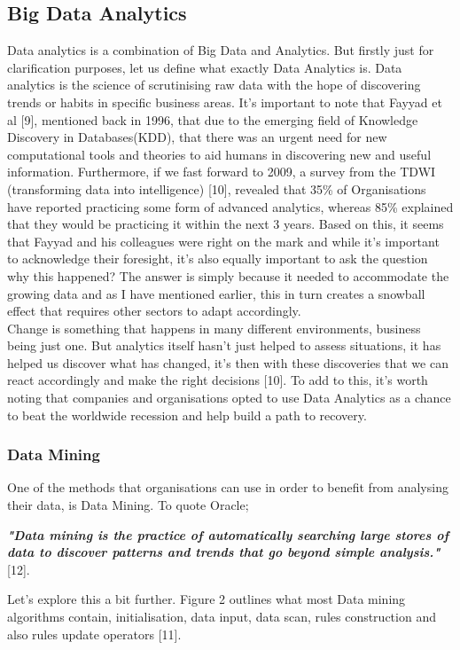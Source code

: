 \documentclass[10pt,journal,compsoc]{IEEEtran}
\begin{document}
\subsection{Big Data Analytics}
 Data analytics is a combination of Big Data and Analytics. But firstly just for clarification purposes, let us define what exactly Data Analytics is. Data analytics is the science of scrutinising raw data with the hope of discovering trends or habits in specific business areas. It's important to note that Fayyad et al [9], mentioned back in 1996, that due to the emerging field of Knowledge Discovery in Databases(KDD), that there was an urgent need for new computational tools and theories to aid humans in discovering new and useful information. Furthermore, if we fast forward to 2009, a survey from the TDWI (transforming data into intelligence) [10], revealed that 35\% of Organisations have reported practicing some form of advanced analytics, whereas 85\% explained that they would be practicing it within the next 3 years. Based on this, it seems that Fayyad and his colleagues were right on the mark and while it's important to acknowledge their foresight, it's also equally important to ask the question why this happened? The answer is simply because it needed to accommodate the growing data and as I have mentioned earlier, this in turn creates a snowball effect that requires other sectors to adapt accordingly.\\
Change is something that happens in many different environments, business being just one. But analytics itself hasn't just helped to assess situations, it has helped us discover what has changed, it's then with these discoveries that we can react accordingly and make the right decisions [10]. To add to this, it's worth noting that companies and organisations opted to use Data Analytics as a chance to beat the worldwide recession and help build a path to recovery.

\subsubsection{Data Mining} 
One of the methods that organisations can use in order to benefit from analysing their data, is Data Mining. To quote Oracle;

\textbf{\textit{"Data mining is the practice of automatically searching large stores of data to discover patterns and trends that go beyond simple analysis."}} [12]. 

Let's explore this a bit further. Figure 2 outlines what most Data mining algorithms contain, initialisation, data input, data scan, rules construction and also rules update operators [11].\\
\end{document}
